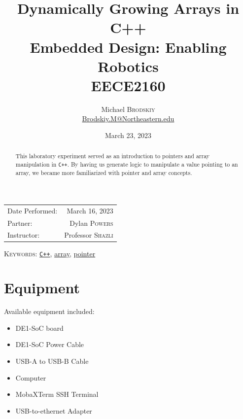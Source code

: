 \documentclass[
	letterpaper, %
	10pt, %
]{CSUniSchoolLabReport}
\title{Dynamically Growing Arrays in C++\\ Embedded Design: Enabling Robotics \\ EECE2160} %
\author{Michael \textsc{Brodskiy}\\ \small \href{mailto:Brodskiy.M@Northeastern.edu}{Brodskiy.M@Northeastern.edu}}
\date{March 23, 2023} %
\begin{document}
\maketitle %

\begin{center}
	\begin{tabular}{l r}
		Date Performed: & March 16, 2023 \\ %
        Partner: & Dylan \textsc{Powers} \\ %
		Instructor: & Professor \textsc{Shazli} %
	\end{tabular}
\end{center}

\newpage

\begin{abstract}

  This laboratory experiment served as an introduction to pointers and array manipulation in \texttt{C++}. By having us generate logic to manipulate a value pointing to an array, we became more familiarized with pointer and array concepts.

\end{abstract}

\begin{flushleft}

  \textsc{Keywords:} \underline{\texttt{C++}}, \underline{array}, \underline{pointer}

\end{flushleft}

\newpage

\section{Equipment}

\hspace{.5 in} Available equipment included:\\

\begin{itemize}

  \item DE1-SoC board

  \item DE1-SoC Power Cable

  \item USB-A to USB-B Cable

  \item Computer

  \item MobaXTerm SSH Terminal

  \item USB-to-ethernet Adapter

\end{itemize}
\end{document}
